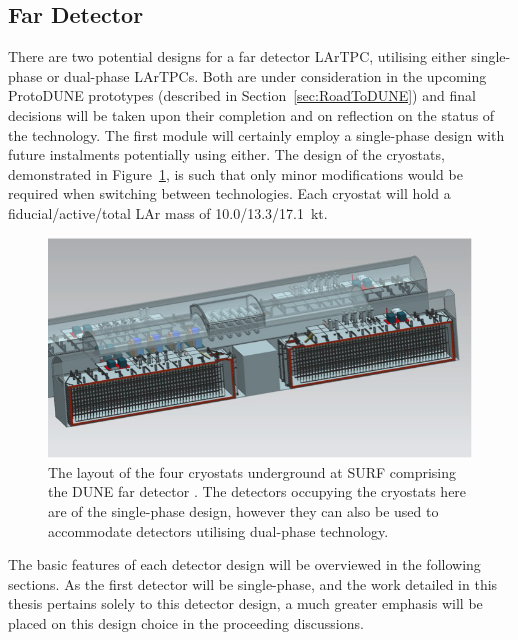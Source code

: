 \subsection{Far Detector}\label{sec:FarDetector}

There are two potential designs for a far detector LArTPC, utilising either single-phase or dual-phase LArTPCs.  Both are under consideration in the upcoming ProtoDUNE prototypes (described in Section~\ref{sec:RoadToDUNE}) and final decisions will be taken upon their completion and on reflection on the status of the technology.  The first module will certainly employ a single-phase design with future instalments potentially using either.  The design of the cryostats, demonstrated in Figure~\ref{fig:FDCryostats}, is such that only minor modifications would be required when switching between technologies.  Each cryostat will hold a fiducial/active/total LAr mass of 10.0/13.3/17.1~kt.

\begin{figure}
  \centering
  \includegraphics[width=12cm]{FDCryostats.png}
  \caption[The layout of the four cryostats underground at SURF comprising the DUNE far detector.]{The layout of the four cryostats underground at SURF comprising the DUNE far detector \cite{DUNECDR4}.  The detectors occupying the cryostats here are of the single-phase design, however they can also be used to accommodate detectors utilising dual-phase technology.}
  \label{fig:FDCryostats}
\end{figure}

The basic features of each detector design will be overviewed in the following sections.  As the first detector will be single-phase, and the work detailed in this thesis pertains solely to this detector design, a much greater emphasis will be placed on this design choice in the proceeding discussions.

